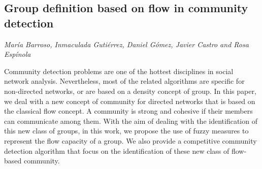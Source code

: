\documentclass[../booklet.tex]{subfiles}
\begin{document}
\subsection[Group definition based on flow in community detection. {\it María Barroso, Inmaculada Gutiérrez, Daniel Gómez, Javier Castro and Rosa Espínola}]{Group definition based on flow in community detection}
    

\begin{center}
  {\it María Barroso, Inmaculada Gutiérrez, Daniel Gómez, Javier Castro and Rosa Espínola}
\end{center}

\vskip 0.8cm



Community detection problems are one of the hottest disciplines in social network analysis. Nevertheless, most of the related algorithms are specific for non-directed networks, or are based on a density concept of group. In this paper, we deal with a new concept of community for directed networks that is based on the classical flow concept.  A community is strong and cohesive if their members can communicate among them. With the aim of dealing with the identification of this new class of groups, in this work, we propose the use of fuzzy measures to represent the flow capacity of a group. We also provide a competitive community detection algorithm that focus on the identification of these new class of flow-based community. 
\color{black}

\end{document}
